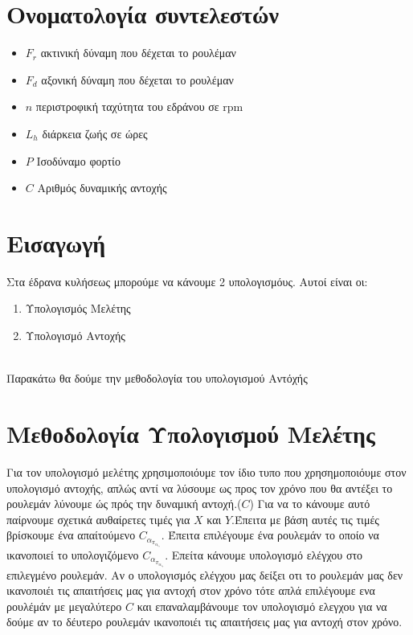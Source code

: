 \documentclass{article}
\begin{document}



\section{Ονοματολογία συντελεστών}
\begin{itemize}
    \item $F_r$ ακτινική δύναμη που δέχεται το ρουλέμαν
    \item $F_d$ αξονική δύναμη που δέχεται το ρουλέμαν
    \item $n$ περιστροφική ταχύτητα του εδράνου σε rpm
    \item $L_h$ διάρκεια ζωής σε ώρες
    \item $P$ Ισοδύναμο φορτίο
    \item $C$ Αριθμός δυναμικής αντοχής
\end{itemize}


\section{Εισαγωγή}
Στα έδρανα κυλήσεως μπορούμε να κάνουμε 2 υπολογισμόυς. Αυτοί είναι οι:
\begin{enumerate}   
    \item Υπολογισμός Μελέτης
    \item Υπολογισμό Αντοχής
\end{enumerate}
\\
Παρακάτω θα δούμε την μεθοδολογία του υπολογισμού Αντόχής




\section{Μεθοδολογία Υπολογισμού Μελέτης}
Για τον υπολογισμό μελέτης χρησιμοποιόυμε τον ίδιο τυπο που χρησημοποιόυμε στον υπολογισμό αντοχής, απλώς αντί να λύσουμε ως προς τον χρόνο που θα αντέξει το ρουλεμάν λύνουμε ώς πρός την δυναμική αντοχή.($C$) Για να το κάνουμε αυτό παίρνουμε σχετικά αυθαίρετες τιμές για $X$ και $Y$.Έπειτα με βάση αυτές τις τιμές βρίσκουμε ένα απαίτούμενο $C_α_π_α_ι_τ$. Έπειτα επιλέγουμε ένα ρουλεμάν το οποίο να ικανοποιεί το υπολογιζόμενο $C_α_π_α_ι_τ$. Επείτα κάνουμε υπολογισμό ελέγχου στο επιλεγμένο ρουλεμάν. Αν ο υπολογισμός ελέγχου μας δείξει οτι το ρουλεμάν μας δεν ικανοποιέι τις απαιτήσεις μας για αντοχή στον χρόνο τότε απλά επιλέγουμε ενα ρουλέμάν με μεγαλύτερο $C$ και επαναλαμβάνουμε τον υπολογισμό ελεγχου για να δούμε αν το δέυτερο ρουλεμάν ικανοποιέι τις απαιτήσεις μας για αντοχή στον χρόνο.
\end{document}
